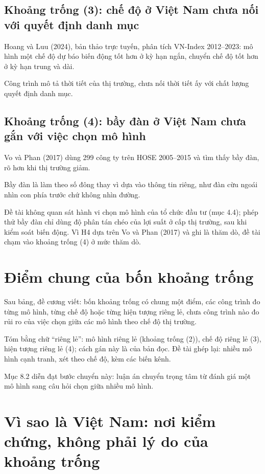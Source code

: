 \subsection{Khoảng trống (3): chế độ ở Việt Nam chưa nối với quyết định danh mục}

Hoang và Luu (2024), bản thảo trực tuyến, phân tích VN-Index 2012--2023: mô hình một chế độ dự báo biến động tốt hơn ở kỳ hạn ngắn, chuyển chế độ tốt hơn ở kỳ hạn trung và dài.

Công trình mô tả thời tiết của thị trường, chưa nối thời tiết ấy với chất lượng quyết định danh mục.

\subsection{Khoảng trống (4): bầy đàn ở Việt Nam chưa gắn với việc chọn mô hình}

Vo và Phan (2017) dùng 299 công ty trên HOSE 2005--2015 và tìm thấy bầy đàn, rõ hơn khi thị trường giảm.

Bầy đàn là làm theo số đông thay vì dựa vào thông tin riêng, như đàn cừu ngoái nhìn con phía trước chứ không nhìn đường.

Đề tài không quan sát hành vi chọn mô hình của tổ chức đầu tư (mục 4.4); phép thử bầy đàn chỉ dùng độ phân tán chéo của lợi suất ở cấp thị trường, sau khi kiểm soát biến động. Vì H4 dựa trên Vo và Phan (2017) và ghi là thăm dò, đề tài chạm vào khoảng trống (4) ở mức thăm dò.

\section{Điểm chung của bốn khoảng trống}

Sau bảng, đề cương viết: bốn khoảng trống có chung một điểm, các công trình đo từng mô hình, từng chế độ hoặc từng hiện tượng riêng lẻ, chưa công trình nào đo rủi ro của việc chọn giữa các mô hình theo chế độ thị trường.

Tóm bằng chữ “riêng lẻ”: mô hình riêng lẻ (khoảng trống (2)), chế độ riêng lẻ (3), hiện tượng riêng lẻ (4); cách gán này là của bản đọc. Đề tài ghép lại: nhiều mô hình cạnh tranh, xét theo chế độ, kèm các biến kênh.

Mục 8.2 diễn đạt bước chuyển này: luận án chuyển trọng tâm từ đánh giá một mô hình sang câu hỏi chọn giữa nhiều mô hình.

\section{Vì sao là Việt Nam: nơi kiểm chứng, không phải lý do của khoảng trống}

